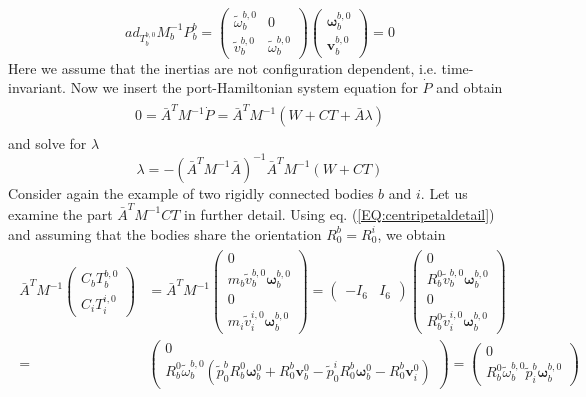 \documentclass[a4paper,twoside, openright,12pt]{report}
\newcommand{\f}[1]{\boldsymbol{#1}}
\begin{document}
\begin{equation}
ad_{T_b^{b,0}}M_b^{-1}P_b^b = \begin{pmatrix}
\tilde{\omega}_b^{b,0} & 0 \\ \tilde{v}_b^{b,0} & \tilde{\omega}_b^{b,0}\end{pmatrix} \begin{pmatrix}\boldsymbol{\omega}_b^{b,0} \\ \f{v}_b^{b,0}\end{pmatrix} = 0
\end{equation}
Here we assume that the inertias are not configuration dependent, i.e. time-invariant. Now we insert the port-Hamiltonian system equation for $\dot{P}$ and obtain
\begin{eqnarray}
\begin{aligned}
0 = \bar{A}^T M^{-1} \dot{P} = \bar{A}^T M^{-1}(W+CT+\bar{A}\lambda)
\end{aligned}
\end{eqnarray}
and solve for $\lambda$
\begin{equation}
\lambda = -(\bar{A}^TM^{-1}\bar{A})^{-1}\bar{A}^TM^{-1}(W+CT)
\end{equation}
Consider again the example of two rigidly connected bodies $b$ and $i$. Let us examine the part $\bar{A}^TM^{-1}CT$ in further detail. Using eq. (\ref{EQ:centripetaldetail}) and assuming that the bodies share the orientation $R_0^b = R_0^i$, we obtain
\begin{eqnarray}
\begin{aligned}
\bar{A}^TM^{-1}\begin{pmatrix}
C_b T_b^{b,0} \\ C_i T_i^{i,0}
\end{pmatrix} 
&=
\bar{A}^T M^{-1} \begin{pmatrix} 0 \\ m_b \tilde{v}_b^{b,0}\boldsymbol{\omega}_b^{b,0} \\ 0 \\ m_i \tilde{v}_i^{i,0}\boldsymbol{\omega}_b^{b,0}
\end{pmatrix}
=
\begin{pmatrix}-I_6 & I_6\end{pmatrix} \begin{pmatrix}
0 \\ R_b^0 \tilde{v}_b^{b,0} \boldsymbol{\omega}_b^{b,0} \\ 0 \\
R_b^0 \tilde{v}_i^{i,0} \boldsymbol{\omega}_b^{b,0}
\end{pmatrix}  \\ 
=&
\begin{pmatrix}
0 \\ R_b^0\tilde{\omega}_b^{b,0}
(\tilde{p}_0^b R_b^0 \boldsymbol{\omega}_b^0 + R_0^b \f{v}_b^0 - \tilde{p}_0^i R_0^b \boldsymbol{\omega}_b^0 - R_0^b \f{v}_i^0)
\end{pmatrix} 
=
\begin{pmatrix}0 \\
R_b^0\tilde{\omega}_b^{b,0}
\tilde{p}_i^b \boldsymbol{\omega}_b^{b,0}
\end{pmatrix} 
\end{aligned}
\end{eqnarray}
\end{document}
